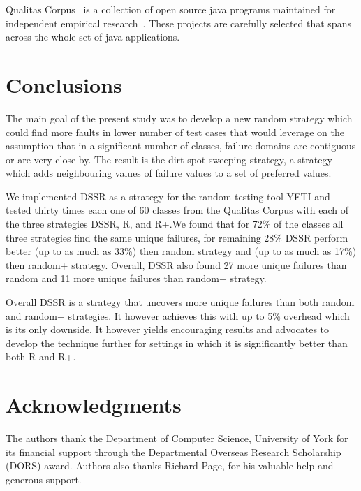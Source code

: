 \documentclass{acm_proc_article-sp}
\begin{document}
Qualitas Corpus~\cite{Tempero2010} is a collection of open source java programs maintained for independent empirical research~\cite{Oriol2012, Tempero2010a, Tempero2008}. These projects are carefully selected that spans across the whole set of java applications.




\section{Conclusions}\label{sec:conc}
The main goal of the present study was to develop a new random strategy which could find more faults in lower number of test cases that would leverage on the assumption that in a significant number of classes, failure domains are contiguous or are very close by. The result is the dirt spot sweeping strategy, a strategy which adds neighbouring values of failure values to a set of preferred values. 

We implemented DSSR as a strategy for the random testing tool YETI and tested thirty times each one of 60 classes from the Qualitas Corpus with each of the three strategies DSSR, R, and R+.We found that for 72\% of the classes all three strategies find the same unique failures, for remaining 28\% DSSR perform better (up to as much as 33\%) then random strategy and (up to as much as 17\%) then random+ strategy.
Overall, DSSR also found 27 more unique failures than random and 11 more unique failures than random+ strategy.

Overall DSSR is a strategy that uncovers more unique failures than both random and random+ strategies. It however achieves this with up to 5\% overhead which is its only downside. It however yields encouraging results and advocates to develop the technique further for settings in which it is significantly better than both R and R+.

\section{Acknowledgments}
The authors thank the Department of Computer Science, University of York for its financial support through the Departmental Overseas Research Scholarship (DORS) award. Authors also thanks Richard Page, for his valuable help and generous support.




%

%
%
\end{document}
